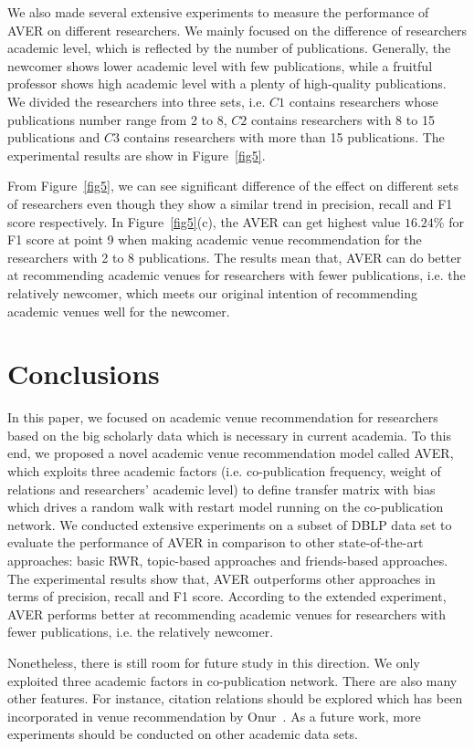 \documentclass[9pt]{acm_proc_article-sp}
\begin{document}
We also made several extensive experiments to measure the performance of AVER on different researchers. We mainly focused on the difference of researchers academic level, which is reflected by the number of publications. Generally, the newcomer shows lower academic level with few publications, while a fruitful professor shows high academic level with a plenty of high-quality publications. We divided the researchers into three sets, i.e. $C1$ contains researchers whose publications number range from 2 to 8, $C2$ contains researchers with 8 to 15 publications and $C3$ contains researchers with more than 15 publications. The experimental results are show in Figure~\ref{fig5}.

From Figure~\ref{fig5}, we can see significant difference of the effect on different sets of researchers even though they show a similar trend in precision, recall and F1 score respectively. In Figure~\ref{fig5}(c), the AVER can get highest value $16.24\%$ for F1 score at point 9 when making academic venue recommendation for the researchers with 2 to 8 publications. The results mean that, AVER can do better at recommending academic venues for researchers with fewer publications, i.e. the relatively newcomer, which meets our original intention of recommending academic venues well for the newcomer.

\section{Conclusions}
In this paper, we focused on academic venue recommendation for researchers based on the big scholarly data which is necessary in current academia. To this end, we proposed a novel academic venue recommendation model called AVER, which exploits three academic factors (i.e. co-publication frequency, weight of relations and researchers' academic level) to define transfer matrix with bias which drives a random walk with restart model running on the co-publication network. We conducted extensive experiments on a subset of DBLP data set to evaluate the performance of AVER in comparison to other state-of-the-art approaches: basic RWR, topic-based approaches and friends-based approaches. The experimental results show that, AVER outperforms other approaches in terms of precision, recall and F1 score. According to the extended experiment, AVER performs better at recommending academic venues for researchers with fewer publications, i.e. the relatively newcomer.

Nonetheless, there is still room for future study in this direction. We only exploited three academic factors in co-publication network. There are also many other features. For instance, citation relations should be explored which has been incorporated in venue recommendation by Onur~\cite{kuccuktuncc2012recommendation}. As a future work, more experiments should be conducted on other academic data sets.





\balancecolumns
\end{document}
